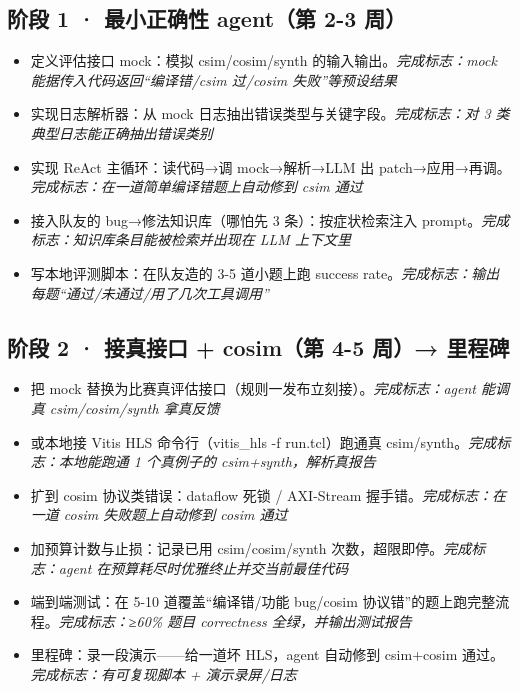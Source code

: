 \documentclass[12pt,a4paper]{ctexbook}
\begin{document}
\subsection*{阶段 1 · 最小正确性 agent（第 2-3 周）}

\begin{itemize}
\item[☐] 定义评估接口 mock：模拟 csim/cosim/synth 的输入输出。\hfill {\small\textit{完成标志：mock 能据传入代码返回“编译错/csim 过/cosim 失败”等预设结果}}
\item[☐] 实现日志解析器：从 mock 日志抽出错误类型与关键字段。\hfill {\small\textit{完成标志：对 3 类典型日志能正确抽出错误类别}}
\item[☐] 实现 ReAct 主循环：读代码→调 mock→解析→LLM 出 patch→应用→再调。\hfill {\small\textit{完成标志：在一道简单编译错题上自动修到 csim 通过}}
\item[☐] 接入队友的 bug→修法知识库（哪怕先 3 条）：按症状检索注入 prompt。\hfill {\small\textit{完成标志：知识库条目能被检索并出现在 LLM 上下文里}}
\item[☐] 写本地评测脚本：在队友造的 3-5 道小题上跑 success rate。\hfill {\small\textit{完成标志：输出每题“通过/未通过/用了几次工具调用”}}
\end{itemize}

\subsection*{阶段 2 · 接真接口 + cosim（第 4-5 周）→ 里程碑}

\begin{itemize}
\item[☐] 把 mock 替换为比赛真评估接口（规则一发布立刻接）。\hfill {\small\textit{完成标志：agent 能调真 csim/cosim/synth 拿真反馈}}
\item[☐] 或本地接 Vitis HLS 命令行（vitis\_hls -f run.tcl）跑通真 csim/synth。\hfill {\small\textit{完成标志：本地能跑通 1 个真例子的 csim+synth，解析真报告}}
\item[☐] 扩到 cosim 协议类错误：dataflow 死锁 / AXI-Stream 握手错。\hfill {\small\textit{完成标志：在一道 cosim 失败题上自动修到 cosim 通过}}
\item[☐] 加预算计数与止损：记录已用 csim/cosim/synth 次数，超限即停。\hfill {\small\textit{完成标志：agent 在预算耗尽时优雅终止并交当前最佳代码}}
\item[☐] 端到端测试：在 5-10 道覆盖“编译错/功能 bug/cosim 协议错”的题上跑完整流程。\hfill {\small\textit{完成标志：≥60\% 题目 correctness 全绿，并输出测试报告}}
\item[☐] 里程碑：录一段演示——给一道坏 HLS，agent 自动修到 csim+cosim 通过。\hfill {\small\textit{完成标志：有可复现脚本 + 演示录屏/日志}}
\end{itemize}
\end{document}
